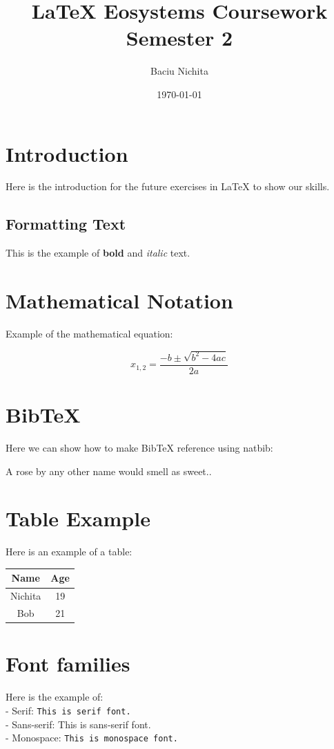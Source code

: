 \documentclass{article}
\title{LaTeX Eosystems Coursework Semester 2}
\author{Baciu Nichita}
\date{\today}
\begin{document}
\maketitle
\tableofcontents

\newpage

\section{Introduction}
Here is the introduction for the future exercises in LaTeX to show our skills. 

\subsection{Formatting Text}
This is the example of \textbf{bold} and \textit{italic} text.

\section{Mathematical Notation}
Example of the mathematical equation:

\begin{equation}
x_{1,2} = \frac{-b \pm \sqrt{b^2 - 4ac}}{2a}
\end{equation}


\section{BibTeX}
Here we can show how to make BibTeX reference using natbib: 

A rose by any other name would smell as sweet.\cite{Shakespeare}.

 


\section{Table Example}
Here is an example of a table:

\begin{table}[h]
\begin{tabular}{|c|c|}
\hline
 Name & Age \\
\hline
Nichita & 19 \\
Bob & 21 \\
\hline
\end{tabular}
\end{table}

\section{Font families}
Here is the example of:\\
- Serif: \texttt{This is serif font.}\\
- Sans-serif: \textsf{This is sans-serif font.}\\
- Monospace: \texttt{This is monospace font.}\\
\end{document}

